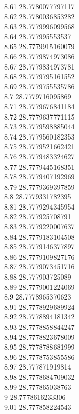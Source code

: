 {8.61	28.7780077797117\\
8.62	28.7780036853282\\
8.63	28.7779996099568\\
8.64	28.777995553537\\
8.65	28.7779915160079\\
8.66	28.7779874973086\\
8.67	28.7779834973781\\
8.68	28.7779795161552\\
8.69	28.7779755535786\\
8.7	28.7779716095869\\
8.71	28.7779676841184\\
8.72	28.7779637771115\\
8.73	28.7779598885044\\
8.74	28.7779560182353\\
8.75	28.7779521662421\\
8.76	28.7779483324627\\
8.77	28.7779445168351\\
8.78	28.7779407192969\\
8.79	28.7779369397859\\
8.8	28.7779331782395\\
8.81	28.7779294345954\\
8.82	28.777925708791\\
8.83	28.7779220007637\\
8.84	28.7779183104508\\
8.85	28.7779146377897\\
8.86	28.7779109827176\\
8.87	28.7779073451716\\
8.88	28.777903725089\\
8.89	28.7779001224069\\
8.9	28.7778965370623\\
8.91	28.7778929689924\\
8.92	28.7778894181342\\
8.93	28.7778858844247\\
8.94	28.7778823678009\\
8.95	28.7778788681999\\
8.96	28.7778753855586\\
8.97	28.777871919814\\
8.98	28.7778684709032\\
8.99	28.777865038763\\
9	28.7778616233306\\
9.01	28.777858224543\\
}
